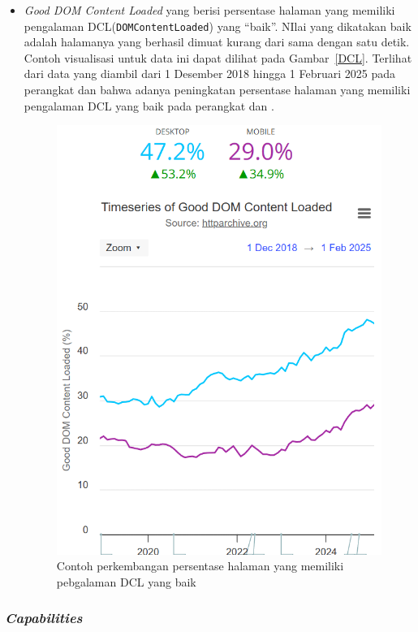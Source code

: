 \begin{itemize}
    \item \textit{Good DOM Content Loaded} yang berisi persentase halaman \web yang memiliki pengalaman DCL(\verb|DOMContentLoaded|) yang ``baik''. NIlai yang dikatakan baik adalah halamanya yang berhasil dimuat kurang dari sama dengan satu detik. Contoh visualisasi untuk data ini dapat dilihat pada Gambar~\ref{DCL}. Terlihat dari data yang diambil dari 1 Desember 2018 hingga 1 Februari 2025 pada perangkat \desktop dan \mobile bahwa adanya peningkatan persentase halaman \web yang memiliki pengalaman DCL yang baik pada perangkat \desktop dan \mobile. 
    \begin{figure}[H]
        \centering
        \includegraphics[width=0.4\linewidth]{Gambar/Contoh DOM.png}
        \caption{Contoh perkembangan persentase halaman \web yang memiliki pebgalaman DCL yang baik}
        \label{fig:DCL}
    \end{figure}
\end{itemize}

\subsubsection{\textit{Capabilities}}
\label{subsub:capable}

